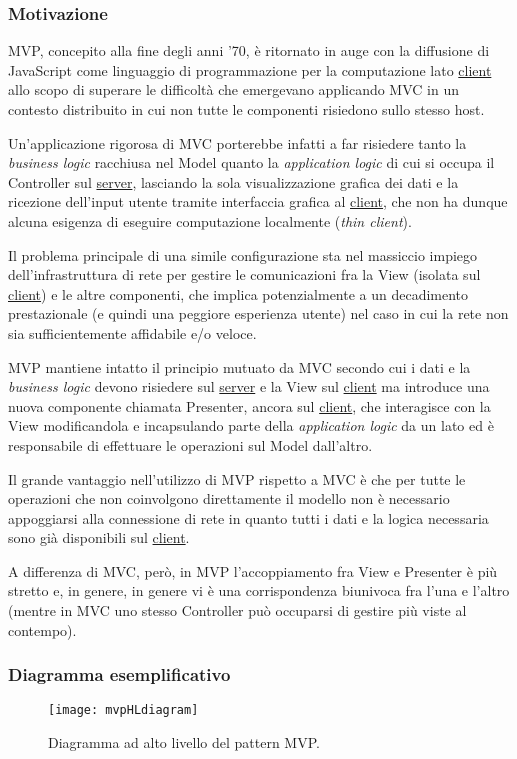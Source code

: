 \subsubsection{Motivazione}
MVP, concepito alla fine degli anni '70, è ritornato in auge con la diffusione di JavaScript come linguaggio di programmazione per la computazione lato \underline{client} allo scopo di superare le difficoltà che emergevano applicando MVC in un contesto distribuito in cui non tutte le componenti risiedono sullo stesso host.

Un'applicazione rigorosa di MVC porterebbe infatti a far risiedere tanto la \textit{business logic} racchiusa nel Model quanto la \textit{application logic} di cui si occupa il Controller sul \underline{server}, lasciando la sola visualizzazione grafica dei dati e la ricezione dell'input utente tramite interfaccia grafica al \underline{client}, che non ha dunque alcuna esigenza di eseguire computazione localmente (\textit{thin client}).

Il problema principale di una simile configurazione sta nel massiccio impiego dell'infrastruttura di rete per gestire le comunicazioni fra la View (isolata sul \underline{client}) e le altre componenti, che implica potenzialmente a un decadimento prestazionale (e quindi una peggiore esperienza utente) nel caso in cui la rete non sia sufficientemente affidabile e/o veloce.

MVP mantiene intatto il principio mutuato da MVC secondo cui i dati e la \textit{business logic} devono risiedere sul \underline{server} e la View sul \underline{client} ma introduce una nuova componente chiamata Presenter, ancora sul \underline{client}, che interagisce con la View modificandola e incapsulando parte della \textit{application logic} da un lato ed è responsabile di effettuare le operazioni sul Model dall'altro.

Il grande vantaggio nell'utilizzo di MVP rispetto a MVC è che per tutte le operazioni che non coinvolgono direttamente il modello non è necessario appoggiarsi alla connessione di rete in quanto tutti i dati e la logica necessaria sono già disponibili sul \underline{client}.

A differenza di MVC, però, in MVP l'accoppiamento fra View e Presenter è più stretto e, in genere, in genere vi è una corrispondenza biunivoca fra l'una e l'altro (mentre in MVC uno stesso Controller può occuparsi di gestire più viste al contempo).

\subsubsection{Diagramma esemplificativo}
\begin{figure}[h]
\centering
\texttt{[image: mvpHLdiagram]}
\caption{Diagramma ad alto livello del pattern MVP.}\label{fig:mvpHL}
\end{figure}


